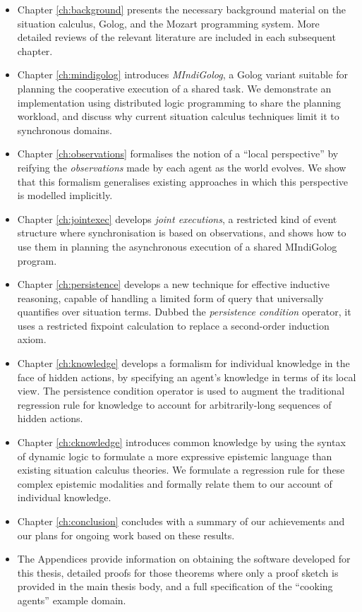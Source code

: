 \begin{itemize}
\item Chapter \ref{ch:background} presents the necessary background material
on the situation calculus, Golog, and the Mozart programming system.
More detailed reviews of the relevant literature are included in each
subsequent chapter. 
\item Chapter \ref{ch:mindigolog} introduces \emph{MIndiGolog}, a Golog
variant suitable for planning the cooperative execution of a shared
task\emph{.} We demonstrate an implementation using distributed logic
programming to share the planning workload, and discuss why current
situation calculus techniques limit it to synchronous domains. 
\item Chapter \ref{ch:observations} formalises the notion of a {}``local
perspective'' by reifying the \emph{observations} made by each agent
as the world evolves. We show that this formalism generalises existing
approaches in which this perspective is modelled implicitly. 
\item Chapter \ref{ch:jointexec} develops \emph{joint executions}, a restricted
kind of event structure where synchronisation is based on observations,
and shows how to use them in planning the asynchronous execution of
a shared MIndiGolog program. 
\item Chapter \ref{ch:persistence} develops a new technique for effective
inductive reasoning, capable of handling a limited form of query that
universally quantifies over situation terms. Dubbed the \emph{persistence
condition} operator, it uses a restricted fixpoint calculation to
replace a second-order induction axiom. 
\item Chapter \ref{ch:knowledge} develops a formalism for individual knowledge
in the face of hidden actions, by specifying an agent's knowledge
in terms of its local view. The persistence condition operator is
used to augment the traditional regression rule for knowledge to account
for arbitrarily-long sequences of hidden actions. 
\item Chapter \ref{ch:cknowledge} introduces common knowledge by using
the syntax of dynamic logic to formulate a more expressive epistemic
language than existing situation calculus theories. We formulate a
regression rule for these complex epistemic modalities and formally
relate them to our account of individual knowledge. 
\item Chapter \ref{ch:conclusion} concludes with a summary of our achievements
and our plans for ongoing work based on these results. 
\item The Appendices provide information on obtaining the software developed
for this thesis, detailed proofs for those theorems where only a proof
sketch is provided in the main thesis body, and a full specification
of the {}``cooking agents'' example domain. 
\end{itemize}
